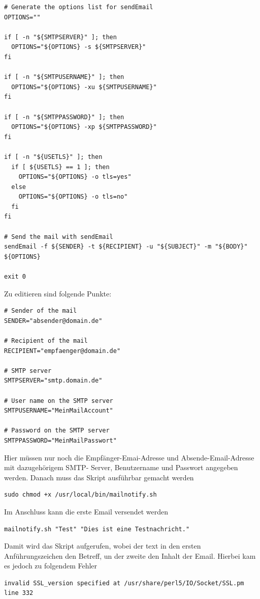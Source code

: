\documentclass[11pt,a4paper]{article} %
\begin{document}
\begin{frame}
\begin{lstlisting}
# Generate the options list for sendEmail
OPTIONS=""

if [ -n "${SMTPSERVER}" ]; then
  OPTIONS="${OPTIONS} -s ${SMTPSERVER}"
fi

if [ -n "${SMTPUSERNAME}" ]; then
  OPTIONS="${OPTIONS} -xu ${SMTPUSERNAME}"
fi

if [ -n "${SMTPPASSWORD}" ]; then
  OPTIONS="${OPTIONS} -xp ${SMTPPASSWORD}"
fi

if [ -n "${USETLS}" ]; then
  if [ ${USETLS} == 1 ]; then
    OPTIONS="${OPTIONS} -o tls=yes"
  else
    OPTIONS="${OPTIONS} -o tls=no"
  fi
fi

# Send the mail with sendEmail
sendEmail -f ${SENDER} -t ${RECIPIENT} -u "${SUBJECT}" -m "${BODY}" ${OPTIONS}

exit 0
\end{lstlisting}
\end{frame}

Zu editieren sind folgende Punkte:
\begin{frame}

\begin{lstlisting}
# Sender of the mail
SENDER="absender@domain.de"

# Recipient of the mail
RECIPIENT="empfaenger@domain.de"

# SMTP server
SMTPSERVER="smtp.domain.de"

# User name on the SMTP server
SMTPUSERNAME="MeinMailAccount"

# Password on the SMTP server
SMTPPASSWORD="MeinMailPasswort"
\end{lstlisting}
\end{frame}
Hier m\"ussen nur noch die Empf\"anger-Emai-Adresse und Absende-Email-Adresse mit dazugeh\"origem SMTP- Server, Benutzername und Passwort angegeben werden.
Danach muss das Skript ausf\"uhrbar gemacht werden
\begin{frame}

\begin{lstlisting}
sudo chmod +x /usr/local/bin/mailnotify.sh
\end{lstlisting}
\end{frame}

Im Anschluss kann die erste Email versendet werden
\begin{frame}

\begin{lstlisting}
mailnotify.sh "Test" "Dies ist eine Testnachricht."

\end{lstlisting}
\end{frame}
Damit wird das Skript aufgerufen, wobei der text in den ersten Anf\"uhrungszeichen den Betreff, un der zweite den Inhalt der Email.
Hierbei kam es jedoch zu folgendem Fehler
\begin{frame}

\begin{lstlisting}
invalid SSL_version specified at /usr/share/perl5/IO/Socket/SSL.pm line 332

\end{lstlisting}
\end{frame}
\end{document}
